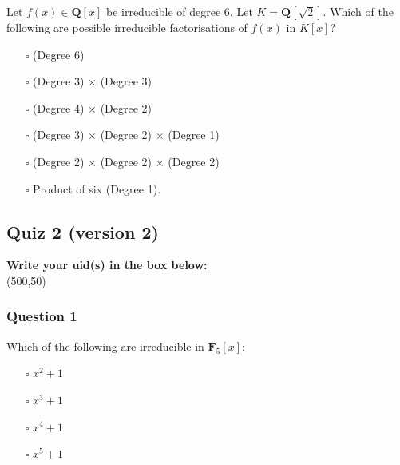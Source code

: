 \documentclass[11pt]{article}
\begin{document}
Let \(f(x) \in \mathbf{Q}[x]\) be irreducible of degree 6.
Let \(K = \mathbf{Q}[\sqrt 2]\).
Which of the following are possible irreducible factorisations of \(f(x)\) in \(K[x]\)?\\

\begin{itemize}
\item[{$\square$}] (Degree 6)\\
\item[{$\square$}] (Degree 3) \(\times\) (Degree 3)\\
\item[{$\square$}] (Degree 4) \(\times\) (Degree 2)\\
\item[{$\square$}] (Degree 3) \(\times\) (Degree 2) \(\times\) (Degree 1)\\
\item[{$\square$}] (Degree 2) \(\times\) (Degree 2) \(\times\) (Degree 2)\\
\item[{$\square$}] Product of six (Degree 1).
\end{itemize}
\subsection{Quiz 2 (version 2)}
\label{sec:orga0fa6bd}
\vspace{1cm}

\noindent
\textbf{Write your uid(s) in the box below:}\\
\framebox(500,50)

\vspace{1cm}
\subsubsection{Question 1}
\label{sec:orgeb2cd21}

Which of the following are irreducible in \(\mathbf{F}_5[x]\):\\

\begin{itemize}
\item[{$\square$}] \(x^2+1\)\\
\item[{$\square$}] \(x^3+1\)\\
\item[{$\square$}] \(x^4+1\)\\
\item[{$\square$}] \(x^5+1\)\\
\end{itemize}
\end{document}

